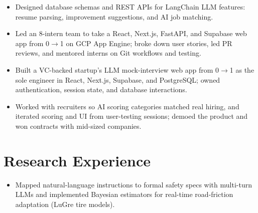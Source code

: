 \documentclass[11pt, letterpaper]{article}
\begin{document}
\vspace{1pt}
\begin{itemize}
  \item Designed database schemas and REST APIs for LangChain LLM features: resume parsing, improvement suggestions, and AI job matching.
  \item Led an 8-intern team to take a React, Next.js, FastAPI, and Supabase web app from 0$\to$1 on GCP App Engine; broke down user stories, led PR reviews, and mentored interns on Git workflows and testing.
\end{itemize}

\vspace{1pt}
\begin{itemize}
  \item Built a VC-backed startup's LLM mock-interview web app from 0$\to$1 as the sole engineer in React, Next.js, Supabase, and PostgreSQL; owned authentication, session state, and database interactions.
  \item Worked with recruiters so AI scoring categories matched real hiring, and iterated scoring and UI from user-testing sessions; demoed the product and won contracts with mid-sized companies.
\end{itemize}

\section{Research Experience}
\begin{itemize}
  \item Mapped natural-language instructions to formal safety specs with multi-turn LLMs and implemented Bayesian estimators for real-time road-friction adaptation (LuGre tire models).
\end{itemize}
\end{document}
